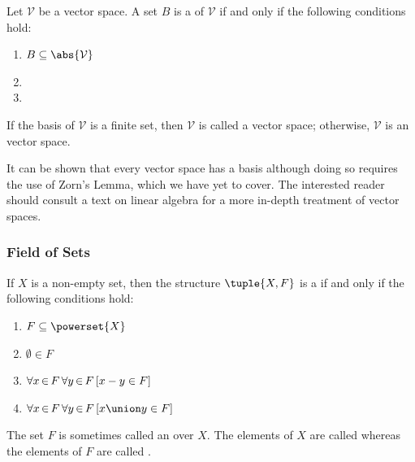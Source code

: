 \begin{dfn}[Basis]
     \label{dfn:vector-space-basis}
    Let \( \mathcal{V} \) be a vector space. A set \( B \) is a  of \( \mathcal{V} \) if and only if
    the following conditions hold:
    \begin{enumerate}[topsep=2pt,noitemsep,label=\textup{\texttt{(\alph*)}}]
        \item \( B \subseteq \abs{\mathcal{V}} \)
        \item {}
        \item {}
    \end{enumerate}
    \vspace{0.1cm}
    \noindent
    If the basis of \( \mathcal{V} \) is a finite set, then \( \mathcal{V} \) is called a  vector space; otherwise,
    \( \mathcal{V} \) is an  vector space.
\end{dfn}

\noindent
It can be shown that every vector space has a basis although doing so requires the use of Zorn's Lemma, which we have yet to cover. The interested reader
should consult a text on linear algebra for a more in-depth treatment of vector spaces.

\subsubsection{Field of Sets}  \label{sec:field-of-sets}
\begin{dfn}
     \label{dfn:field-of-sets}
    If \( X \) is a non-empty set, then the structure \( \tuple{X, F} \) is a  if and only if the following conditions hold:
    \begin{enumerate}[topsep=3pt,noitemsep,label=\textup{\texttt{(\alph*)}}]
        \item \( F \subseteq \powerset{X} \)  \label{enum:field-of-sets-F-is-a-system-of-subsets-of-X}
        \item \( \emptyset \in F \)  \label{enum:field-of-sets-contains-empty-set}
        \item \( \forall x\,{\in}\,F \, \forall y\,{\in}\,F \, \mleft[ x - y \in F \mright] \)  \label{enum:field-of-sets-closure-under-complementation}
        \item \( \forall x\,{\in}\,F \, \forall y\,{\in}\,F \, \mleft[ x \union y \in F \mright] \)  \label{enum:field-of-sets-closure-under-binary-union}
    \end{enumerate}
    The set \( F \) is sometimes called an  over \( X \). The elements of \( X \) are called  whereas the elements
    of \( F \) are called .
\end{dfn}

